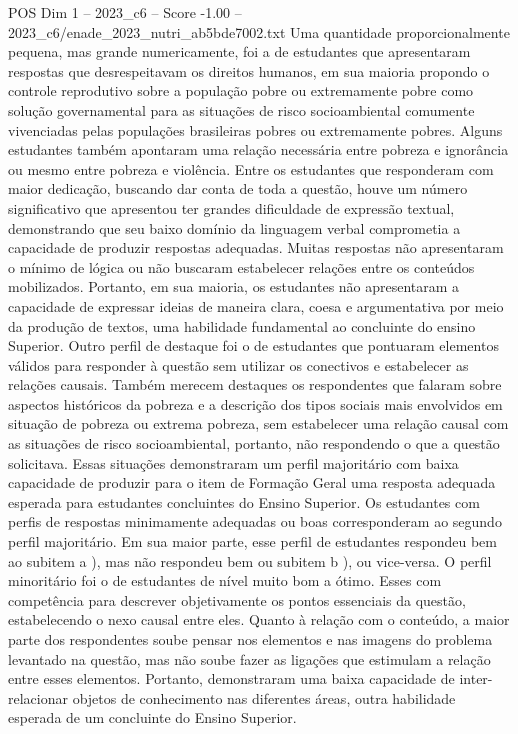 \begin{textsample}{POS Dim 1 – 2023\_c6 – Score -1.00 – 2023\_c6/enade\_2023\_nutri\_ab5bde7002.txt}
Uma quantidade proporcionalmente pequena, mas grande numericamente, foi a de estudantes que apresentaram respostas que desrespeitavam os direitos humanos, em sua maioria propondo o controle reprodutivo sobre a população pobre ou extremamente pobre como solução governamental para as situações de risco socioambiental comumente vivenciadas pelas populações brasileiras pobres ou extremamente pobres.
Alguns estudantes também apontaram uma relação necessária entre pobreza e ignorância ou mesmo entre pobreza e violência.
Entre os estudantes que responderam com maior dedicação, buscando dar conta de toda a questão, houve um número significativo que apresentou ter grandes dificuldade de expressão textual, demonstrando que seu baixo domínio da linguagem verbal comprometia a capacidade de produzir respostas adequadas.
Muitas respostas não apresentaram o mínimo de lógica ou não buscaram estabelecer relações entre os conteúdos mobilizados.
Portanto, em sua maioria, os estudantes não apresentaram a capacidade de expressar ideias de maneira clara, coesa e argumentativa por meio da produção de textos, uma habilidade fundamental ao concluinte do ensino Superior.
Outro perfil de destaque foi o de estudantes que pontuaram elementos válidos para responder à questão sem utilizar os conectivos e estabelecer as relações causais.
Também merecem destaques os respondentes que falaram sobre aspectos históricos da pobreza e a descrição dos tipos sociais mais envolvidos em situação de pobreza ou extrema pobreza, sem estabelecer uma relação causal com as situações de risco socioambiental, portanto, não respondendo o que a questão solicitava.
Essas situações demonstraram um perfil majoritário com baixa capacidade de produzir para o item de Formação Geral uma resposta adequada esperada para estudantes concluintes do Ensino Superior.
Os estudantes com perfis de respostas minimamente adequadas ou boas corresponderam ao segundo perfil majoritário.
Em sua maior parte, esse perfil de estudantes respondeu bem ao subitem a ), mas não respondeu bem ou subitem b ), ou vice-versa.
O perfil minoritário foi o de estudantes de nível muito bom a ótimo.
Esses com competência para descrever objetivamente os pontos essenciais da questão, estabelecendo o nexo causal entre eles.
Quanto à relação com o conteúdo, a maior parte dos respondentes soube pensar nos elementos e nas imagens do problema levantado na questão, mas não soube fazer as ligações que estimulam a relação entre esses elementos.
Portanto, demonstraram uma baixa capacidade de inter-relacionar objetos de conhecimento nas diferentes áreas, outra habilidade esperada de um concluinte do Ensino Superior.

\end{textsample}
